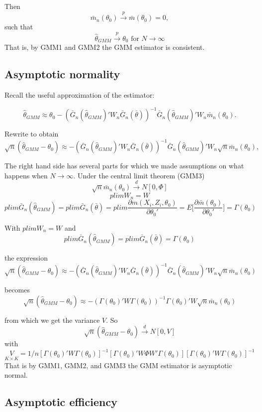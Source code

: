 \documentclass[a4paper,12pt]{article}
\begin{document}
Then $$\bar{m}_n(\theta_0)\overset{p}{\to}\bar{m}(\theta_0)=0,$$
such that $$\hat{\theta}_{GMM}\overset{p}{\to}\theta_0 \text{ for } N\to\infty$$
That is, by GMM1 and GMM2 the GMM estimator is consistent.




\subsection{Asymptotic normality}

Recall the useful approximation of the estimator:

$$\hat{\theta}_{GMM}\approx \theta_0-(\bar{G}_n(\hat{\theta}_{GMM})'W_n\bar{G}_n(\bar{\theta}))^{-1}\bar{G}_n(\hat{\theta}_{GMM})'W_n\bar{m}_n(\theta_0).$$

Rewrite to obtain
$$\sqrt{n}(\hat{\theta}_{GMM}-\theta_0)\approx -(\bar{G}_n(\hat{\theta}_{GMM})'W_n\bar{G}_n(\bar{\theta}))^{-1}\bar{G}_n(\hat{\theta}_{GMM})'W_n\sqrt{n}\bar{m}_n(\theta_0),$$

The right hand side has several parts for which we made assumptions on what happens when $N\to\infty$. Under the central limit theorem (GMM3)
$$\sqrt{n}\bar{m}_n(\theta_0)\overset{d}{\to}N[0,\Phi]$$
$$plim W_n=W$$
$$plim\bar{G}_n(\hat{\theta}_{GMM})=plim\bar{G}_n(\bar{\theta})=plim\frac{\partial m(X_i,Z_i,\theta_0)}{\partial \theta_0'}=E\bigg[\frac{\partial \bar{m}(\theta_0)}{\partial \theta_0'}\bigg]=\Gamma(\theta_0)$$



With $plim W_n=W$ and $$plim\bar{G}_n(\hat{\theta}_{GMM})=plim\bar{G}_n(\bar{\theta})=\Gamma(\theta_0)$$

the expression
$$\sqrt{n}(\hat{\theta}_{GMM}-\theta_0)\approx -(\bar{G}_n(\hat{\theta}_{GMM})'W_n\bar{G}_n(\bar{\theta}))^{-1}\bar{G}_n(\hat{\theta}_{GMM})'W_n\sqrt{n}\bar{m}_n(\theta_0)$$

becomes
$$\sqrt{n}(\hat{\theta}_{GMM}-\theta_0)\approx -(\Gamma(\theta_0)'W\Gamma(\theta_0))^{-1}\Gamma(\theta_0)'W\sqrt{n}\bar{m}_n(\theta_0)$$

from which we get the variance $V$. So
$$\sqrt{n}(\hat{\theta}_{GMM}-\theta_0)\overset{d}{\to}N[0,V]$$
with $$\underset{\scriptscriptstyle K\times K}{V}=1/n[\Gamma(\theta_0)'W\Gamma(\theta_0)]^{-1}[\Gamma(\theta_0)'W\Phi W'\Gamma(\theta_0)][\Gamma(\theta_0)'W\Gamma(\theta_0)]^{-1}$$
That is by GMM1, GMM2, and GMM3 the GMM estimator is asymptotic normal.


\subsection{Asymptotic efficiency}
\end{document}
